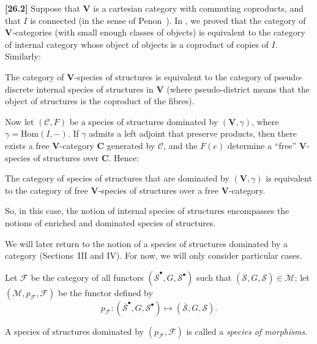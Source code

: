 \documentclass[a4paper,fleqn]{article}
\theoremstyle{plain}
\newenvironment{proposition}[1]
  {\renewcommand\theinnerproposition{#1}\innerproposition}
  {\endinnerproposition}
\theoremstyle{definition}
\newenvironment{definition}[1]
  {\renewcommand\theinnerdefinition{#1}\innerdefinition}
  {\endinnerdefinition}
\newenvironment{longcomm}[1]
  {\noindent\textbf{[#1]}\rmfamily}
  {}
\newcommand{\CC}{\mathcal{C}}
\renewcommand{\SS}{\mathcal{S}}
\newcommand{\bSS}{\overline{\SS}}
\newcommand{\MM}{\mathcal{M}}
\newcommand{\FF}{\mathcal{F}}
\newcommand{\Hom}{\mathrm{Hom}}
\newcommand{\smallbullet}{\bullet}
\begin{document}
\begin{longcomm}{26.2}
  Suppose that $\mathbf{V}$ is a cartesian category with commuting coproducts, and that $I$ is connected (in the sense of Penon~\cite{comm83}).
  In \cite[Appendix]{coll120}, we proved that the category of $\mathbf{V}$-categories (with small enough classes of objects) is equivalent to the category of internal category whose object of objects is a coproduct of copies of $I$.
  Similarly:

  \begin{proposition}{A}
    The category of $\mathbf{V}$-species of structures is equivalent to the category of pseudo-discrete internal species of structures in $\mathbf{V}$ (where pseudo-district means that the object of structures is the coproduct of the fibres).
  \end{proposition}

  Now let $(\CC,F)$ be a species of structures dominated by $(\mathbf{V},\gamma)$, where $\gamma=\Hom(I,-)$.
  If $\gamma$ admits a left adjoint that preserve products, then there exists a free $\mathbf{V}$-category $\mathbf{C}$ generated by $\CC$, and the $F(e)$ determine a ``free'' $\mathbf{V}$-species of structures over $\mathbf{C}$.
  Hence:

  \begin{proposition}{B}
    The category of species of structures that are dominated by $(\mathbf{V},\gamma)$ is equivalent to the category of free $\mathbf{V}$-species of structures over a free $\mathbf{V}$-category.
  \end{proposition}

  So, in this case, the notion of internal species of structures encompasses the notions of enriched and dominated species of structures.
\end{longcomm}

We will later return to the notion of a species of structures dominated by a category (Sections~III and IV).
For now, we will only consider particular cases.

Let $\FF$ be the category of all functors $(\bSS^\smallbullet,G,\SS^\smallbullet)$ such that $(\bSS,G,\SS)\in\MM$;
let $(\MM,p_\FF,\FF)$ be the functor defined by
\[
  p_\FF\colon(\bSS^\smallbullet,G,\SS^\smallbullet)
  \longmapsto (\bSS,G,\SS).
\]

\begin{definition}{4}
\label{definition:i-4}
  A species of structures dominated by $(p_\FF,\FF)$ is called a \emph{species of morphisms}.
\end{definition}
\end{document}
